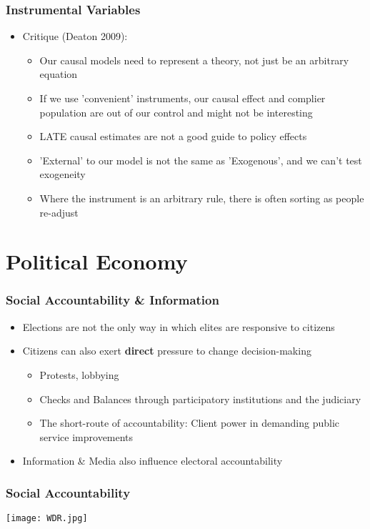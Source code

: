 \documentclass[xcolor=x11names,compress]{beamer}\usepackage[]{graphicx}\usepackage[]{color}
\renewcommand{\(}{\begin{columns}}
\renewcommand{\)}{\end{columns}}
\newcommand{\<}[1]{\begin{column}{#1}}
\renewcommand{\>}{\end{column}}
\begin{document}
\begin{frame}
\frametitle{Instrumental Variables}
\begin{itemize}
\item Critique (Deaton 2009):
\pause
\begin{itemize}
\item Our causal models need to represent a theory, not just be an arbitrary equation
\pause
\item If we use 'convenient' instruments, our causal effect and complier population are out of our control and might not be interesting
\pause
\item LATE causal estimates are not a good guide to policy effects
\pause
\item 'External' to our model is not the same as 'Exogenous', and we can't test exogeneity
\pause
\item Where the instrument is an arbitrary rule, there is often sorting as people re-adjust
\end{itemize}
\end{itemize}
\end{frame}

\section{Political Economy}

\begin{frame}
\frametitle{Social Accountability \& Information}
\begin{itemize}
\item Elections are not the only way in which elites are responsive to citizens
\pause
\item Citizens can also exert \textbf{direct} pressure to change decision-making
\begin{itemize}
\item Protests, lobbying
\item Checks and Balances through participatory institutions and the judiciary
\item The short-route of accountability: Client power in demanding public service improvements
\pause
\end{itemize}
\item Information \& Media also influence electoral accountability
\end{itemize}
\end{frame}

\begin{frame}
\frametitle{Social Accountability}
\begin{center}
\texttt{[image: WDR.jpg]}
\end{center}
\end{frame}
\end{document}
